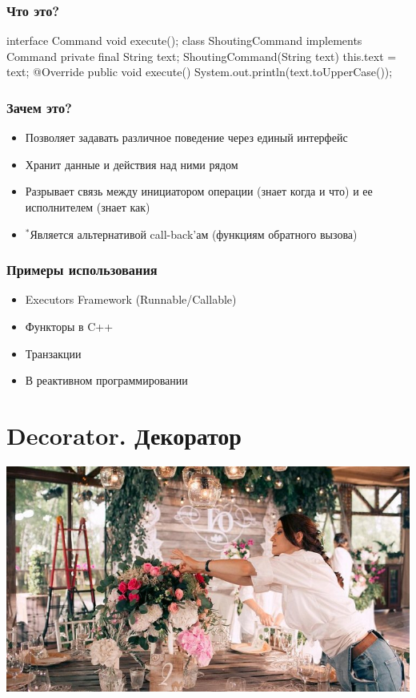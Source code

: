\documentclass[russian,aspectratio=169,14pt]{beamer}
\begin{document}
\begin{frame}[fragile]
	\frametitle{Что это?}
	\begin{listjava}
interface Command {
    void execute();
}
class ShoutingCommand implements Command {
    private final String text;
    ShoutingCommand(String text) {
        this.text = text;
    }
    @Override
    public void execute() {
        System.out.println(text.toUpperCase());
    }
}
	\end{listjava}
\end{frame}

\begin{frame}
	\frametitle{Зачем это?}
	\begin{itemize}
		\item Позволяет задавать различное поведение через единый интерфейс
		\pause
		\item Хранит данные и действия над ними рядом
		\pause
		\item Разрывает связь между инициатором операции (знает когда и что) и ее исполнителем (знает как)
		\pause
		\item $^*$Является альтернативой call-back'ам (функциям обратного вызова)
	\end{itemize}
\end{frame}

\begin{frame}
	\frametitle{Примеры использования}
	\begin{itemize}
		\item Executors Framework (Runnable/Callable)
		\item Функторы в C++
		\item Транзакции
		\item В реактивном программировании
	\end{itemize}
\end{frame}




\section{Decorator. Декоратор}

\begin{frame}
    \begin{center}
	\includegraphics[height=0.8\textheight]{decorator.jpg}
	\end{center}
\end{frame}
\end{document}
